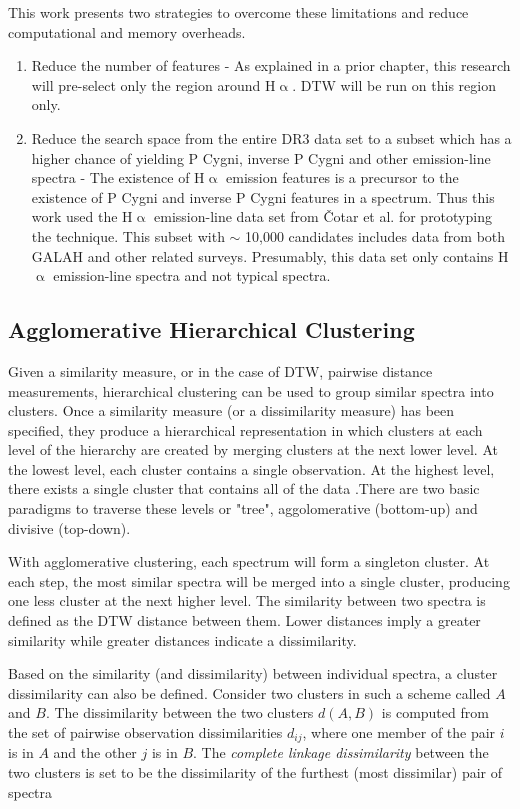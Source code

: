 This work presents two strategies to overcome these limitations and reduce computational and memory overheads.

\begin{enumerate}
    \item Reduce the number of features - As explained in a prior chapter, this research will pre-select only the region around H$\upalpha$. DTW will be run on this region only.
    \item Reduce the search space from the entire DR3 data set to a subset which has a higher chance of yielding P Cygni, inverse P Cygni and other emission-line spectra - The existence of H$\upalpha$ emission features is a precursor to the existence of P Cygni and inverse P Cygni features in a spectrum. Thus this work used the H$\upalpha$ emission-line data set from Čotar et al.\cite{vcotar2021galah} for prototyping the technique. This subset with $\sim$ 10,000 candidates includes data from both GALAH and other related surveys. Presumably, this data set only contains H$\upalpha$ emission-line spectra and not typical spectra.
\end{enumerate}

\subsection{Agglomerative Hierarchical Clustering}

Given a similarity measure, or in the case of DTW, pairwise distance measurements, hierarchical clustering can be used to group similar spectra into clusters. Once a similarity measure (or a dissimilarity measure) has been specified, they produce a hierarchical representation in which clusters at each level of the hierarchy are created by merging clusters at the next lower level. At the lowest level, each cluster contains a single observation. At the highest level, there exists a single cluster that contains all of the data \cite{hastie2009elements}.There are two basic paradigms to traverse these levels or "tree", aggolomerative (bottom-up) and divisive (top-down). 

With agglomerative clustering, each spectrum will form a singleton cluster. At each step, the most similar spectra will be merged into a single cluster, producing one less cluster at the next higher level. The similarity between two spectra is defined as the DTW distance between them. Lower distances imply a greater similarity while greater distances indicate a dissimilarity. 

Based on the similarity (and dissimilarity) between individual spectra, a cluster dissimilarity can also be defined. Consider two clusters in such a scheme called $A$ and $B$. The dissimilarity between the two clusters $d(A,B)$ is computed from the set of pairwise observation dissimilarities $d_{ij}$, where one member of the pair $i$ is in $A$ and the other $j$ is in $B$. The \emph{complete linkage dissimilarity} between the two clusters is set to be the dissimilarity of the furthest (most dissimilar) pair of spectra

